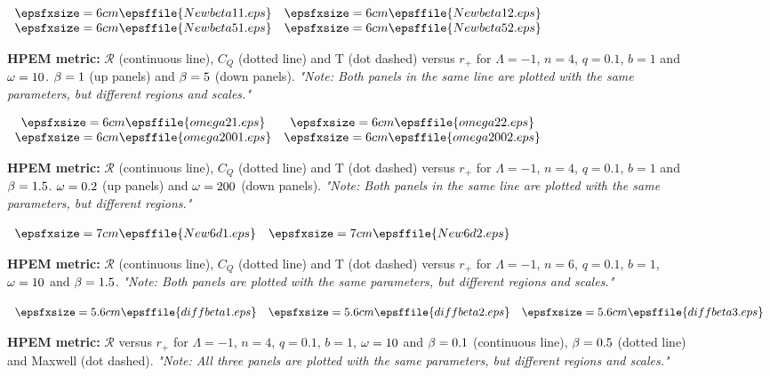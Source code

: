 \documentclass[aps,onecolumn ]{revtex4}
\begin{document}
\begin{figure}[tbp]
$%
\begin{array}{cc}
\epsfxsize=6cm \epsffile{Newbeta11.eps} & \epsfxsize=6cm %
\epsffile{Newbeta12.eps} \\
\epsfxsize=6cm \epsffile{Newbeta51.eps} & \epsfxsize=6cm %
\epsffile{Newbeta52.eps}%
\end{array}
$%
\caption{\textbf{HPEM metric:} $\mathcal{R}$ (continuous line),
$C_{Q}$
(dotted line) and {T} (dot dashed) versus $r_{+}$ for $\Lambda =-1$, $n=4$, $%
q=0.1$, $b=1$ and $\protect\omega =10$. $\protect\beta =1$ (up panels) and $%
\protect\beta =5$ (down panels). \emph{"Note: Both panels in the
same line are plotted with the same parameters, but different
regions and scales."}} \label{FigHPEMbeta}
\end{figure}

\begin{figure}[tbp]
$%
\begin{array}{cc}
\epsfxsize=6cm \epsffile{omega21.eps} & \epsfxsize=6cm %
\epsffile{omega22.eps} \\
\epsfxsize=6cm \epsffile{omega2001.eps} & \epsfxsize=6cm %
\epsffile{omega2002.eps}%
\end{array}
$%
\caption{\textbf{HPEM metric:} $\mathcal{R}$ (continuous line),
$C_{Q}$
(dotted line) and {T} (dot dashed) versus $r_{+}$ for $\Lambda =-1$, $n=4$, $%
q=0.1$, $b=1$ and $\protect\beta =1.5$. $\protect\omega =0.2$ (up
panels) and $\protect\omega =200$ (down panels). \emph{"Note: Both
panels in the same line are plotted with the same parameters, but
different regions."}} \label{FigHPEMomega}
\end{figure}

\begin{figure}[tbp]
$%
\begin{array}{cc}
\epsfxsize=7cm \epsffile{New6d1.eps} & \epsfxsize=7cm \epsffile{New6d2.eps}%
\end{array}
$%
\caption{\textbf{HPEM metric:} $\mathcal{R}$ (continuous line),
$C_{Q}$
(dotted line) and {T} (dot dashed) versus $r_{+}$ for $\Lambda =-1$, $n=6$, $%
q=0.1$, $b=1$, $\protect\omega =10$ and $\protect\beta =1.5$.
\emph{"Note: Both panels are plotted with the same parameters, but
different regions and scales."}} \label{FigHPEMn6}
\end{figure}

\begin{figure}[tbp]
$%
\begin{array}{ccc}
\epsfxsize=5.6cm \epsffile{diffbeta1.eps} & \epsfxsize=5.6cm \epsffile{diffbeta2.eps} & \epsfxsize=5.6cm \epsffile{diffbeta3.eps} %
\end{array}
$%
\caption{\textbf{HPEM metric:} $\mathcal{R}$ versus $r_{+}$ for $\Lambda =-1$, $n=4$, $%
q=0.1$, $b=1$, $\protect\omega =10$ and $\protect\beta =0.1$
(continuous line), $\protect\beta =0.5$ (dotted line) and Maxwell
(dot dashed). \emph{"Note: All three panels are plotted with the
same parameters, but different regions and scales."}}
\label{FigHPEMomega}
\end{figure}
\end{document}
